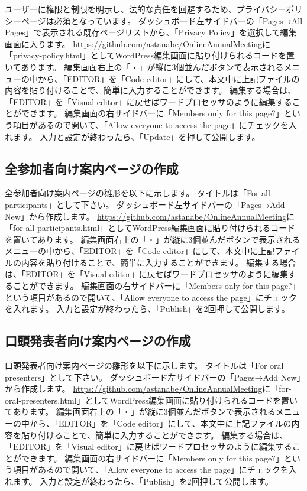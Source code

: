\documentclass[titlepage,10pt,a4paper,uplatex]{jsbook}
\begin{document}
ユーザーに権限と制限を明示し、法的な責任を回避するため、プライバシーポリシーページは必須となっています。
ダッシュボード左サイドバーの「Pages→All Pages」で表示される既存ページリストから、「Privacy Policy」を選択して編集画面に入ります。
\url{https://github.com/astanabe/OnlineAnnualMeeting}に「privacy-policy.html」としてWordPress編集画面に貼り付けられるコードを置いてあります。
編集画面右上の「・」が縦に3個並んだボタンで表示されるメニューの中から、「EDITOR」を「Code editor」にして、本文中に上記ファイルの内容を貼り付けることで、簡単に入力することができます。
編集する場合は、「EDITOR」を「Visual editor」に戻せばワードプロセッサのように編集することができます。
編集画面の右サイドバーに「Members only for this page?」という項目があるので開いて、「Allow everyone to access the page」にチェックを入れます。
入力と設定が終わったら、「Update」を押して公開します。

\subsection{全参加者向け案内ページの作成}

全参加者向け案内ページの雛形を以下に示します。
タイトルは「For all participants」として下さい。
ダッシュボード左サイドバーの「Pages→Add New」から作成します。
\url{https://github.com/astanabe/OnlineAnnualMeeting}に「for-all-participants.html」としてWordPress編集画面に貼り付けられるコードを置いてあります。
編集画面右上の「・」が縦に3個並んだボタンで表示されるメニューの中から、「EDITOR」を「Code editor」にして、本文中に上記ファイルの内容を貼り付けることで、簡単に入力することができます。
編集する場合は、「EDITOR」を「Visual editor」に戻せばワードプロセッサのように編集することができます。
編集画面の右サイドバーに「Members only for this page?」という項目があるので開いて、「Allow everyone to access the page」にチェックを入れます。
入力と設定が終わったら、「Publish」を2回押して公開します。

\subsection{口頭発表者向け案内ページの作成}

口頭発表者向け案内ページの雛形を以下に示します。
タイトルは「For oral presenters」として下さい。
ダッシュボード左サイドバーの「Pages→Add New」から作成します。
\url{https://github.com/astanabe/OnlineAnnualMeeting}に「for-oral-presenters.html」としてWordPress編集画面に貼り付けられるコードを置いてあります。
編集画面右上の「・」が縦に3個並んだボタンで表示されるメニューの中から、「EDITOR」を「Code editor」にして、本文中に上記ファイルの内容を貼り付けることで、簡単に入力することができます。
編集する場合は、「EDITOR」を「Visual editor」に戻せばワードプロセッサのように編集することができます。
編集画面の右サイドバーに「Members only for this page?」という項目があるので開いて、「Allow everyone to access the page」にチェックを入れます。
入力と設定が終わったら、「Publish」を2回押して公開します。
\end{document}
